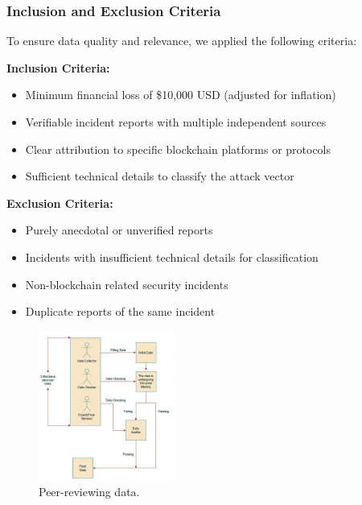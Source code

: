 \subsubsection{Inclusion and Exclusion Criteria}
To ensure data quality and relevance, we applied the following criteria:

\textbf{Inclusion Criteria:}
\begin{itemize}
    \item Minimum financial loss of \$10,000 USD (adjusted for inflation)
    \item Verifiable incident reports with multiple independent sources
    \item Clear attribution to specific blockchain platforms or protocols
    \item Sufficient technical details to classify the attack vector
\end{itemize}

\textbf{Exclusion Criteria:}
\begin{itemize}
    \item Purely anecdotal or unverified reports
    \item Incidents with insufficient technical details for classification
    \item Non-blockchain related security incidents
    \item Duplicate reports of the same incident
\end{itemize}

\begin{figure}[H]
    \centering
    \includegraphics[width=0.4\textwidth]{../figure/methodology/peer_review.jpg}
    \caption{Peer-reviewing data.}
    \label{fig:peer_review}
\end{figure} 

